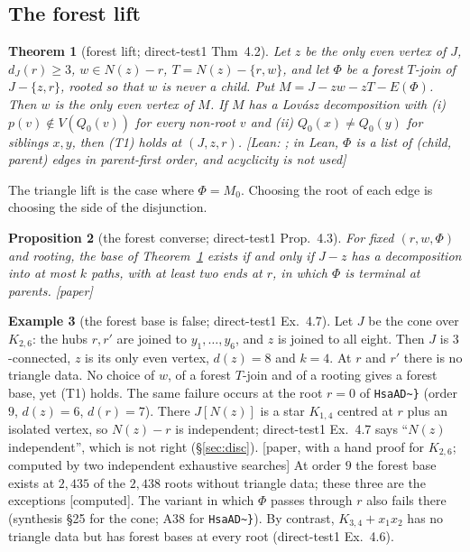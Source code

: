 \documentclass[11pt]{amsart}
\newtheorem{theorem}{Theorem}[section]
\newtheorem{proposition}[theorem]{Proposition}
\theoremstyle{definition}
\newtheorem{example}[theorem]{Example}
\newcommand{\st}[1]{\textsf{\small[#1]}}
\begin{document}
\subsection{The forest lift}

\begin{theorem}[forest lift; direct-test1 Thm~4.2]\label{thm:forest}
Let $z$ be the only even vertex of $J$, $d_J(r)\ge3$, $w\in N(z)-r$, $T=N(z)-\{r,w\}$, and let $\Phi$ be
a forest $T$-join of $J-\{z,r\}$, rooted so that $w$ is never a child. Put $M=J-zw-zT-E(\Phi)$. Then $w$ is
the only even vertex of $M$. If $M$ has a Lov\'asz decomposition with (i) $p(v)\notin V(Q_0(v))$ for
every non-root $v$ and (ii) $Q_0(x)\ne Q_0(y)$ for siblings $x,y$, then (T1) holds at $(J,z,r)$.
\st{Lean: ; in Lean, $\Phi$ is a list of (child, parent) edges in
parent-first order, and acyclicity is not used}
\end{theorem}

The triangle lift is the case where $\Phi=M_0$. Choosing the root of each edge is choosing the side of
the disjunction.

\begin{proposition}[the forest converse; direct-test1 Prop.~4.3]\label{prop:forestconv}
For fixed $(r,w,\Phi)$ and rooting, the base of Theorem~\ref{thm:forest} exists if and only if $J-z$ has
a decomposition into at most $k$ paths, with at least two ends at $r$, in which $\Phi$ is terminal at
parents. \st{paper}
\end{proposition}

\begin{example}[the forest base is false; direct-test1 Ex.~4.7]\label{ex:k26}
Let $J$ be the cone over $K_{2,6}$: the hubs $r,r'$ are joined to $y_1,\dots,y_6$, and $z$ is joined to
all eight. Then $J$ is $3$-connected, $z$ is its only even vertex, $d(z)=8$ and $k=4$. At $r$ and $r'$
there is no triangle data. No choice of $w$, of a forest $T$-join and of a rooting gives a forest base,
yet (T1) holds. The same failure occurs at the root $r=0$ of \texttt{HsaAD\textasciitilde\}} (order $9$,
$d(z)=6$, $d(r)=7$). There $J[N(z)]$ is a star $K_{1,4}$ centred at $r$ plus an isolated vertex, so
$N(z)-r$ is independent; direct-test1 Ex.~4.7 says ``$N(z)$ independent'', which is not right
(\S\ref{sec:disc}). \st{paper, with a hand proof for $K_{2,6}$; computed by two independent
exhaustive searches} At order $9$ the forest base exists at $2{,}435$ of the $2{,}438$ roots without
triangle data; these three are the exceptions \st{computed}. The variant in which $\Phi$ passes through
$r$ also fails there (synthesis \S25 for the cone; A38 for \texttt{HsaAD\textasciitilde\}}). By contrast, $K_{3,4}+x_1x_2$ has no triangle data but has forest
bases at every root (direct-test1 Ex.~4.6).
\end{example}
\end{document}
